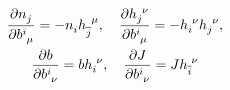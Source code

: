 \documentclass[aps,prd,reprint,preprintnumbers,superscriptaddress,showpacs,floatfix]{revtex4-2}
\begin{document}
\begin{equation}
  \begin{gathered}
    \frac{\partial\tensor{n}{_j}}{\partial\tensor{b}{^i_\mu}}=-\tensor{n}{_i}\tensor{h}{_{\overline{j}}^\mu}, \quad \frac{\partial\tensor{h}{_j^\nu}}{\partial\tensor{b}{^i_\mu}}=-\tensor{h}{_i^\nu}\tensor{h}{_j^\nu},\\
    \frac{\partial b}{\partial\tensor{b}{^i_\nu}}=b\tensor{h}{_i^\nu}, \quad \frac{\partial J}{\partial\tensor{b}{^i_\nu}}=J\tensor{h}{_{\overline{i}}^\nu}
  \end{gathered}
  \label{<+label+>}
\end{equation}

\begin{acknowledgments}


\end{acknowledgments}



\end{document}
